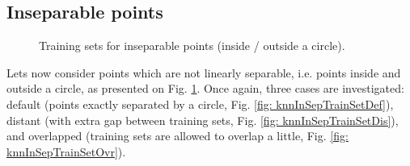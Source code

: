 \subsection{Inseparable points}
\label{sec: knnInSep}

\begin{figure}
\hfill
{}
\hfill
{}
\hfill
\centering{}
\hfill
\caption{Training sets for inseparable points (inside / outside a circle).}
\label{fig: knnInSepTrainSet}
\end{figure}

Lets now consider points which are not linearly separable, i.e. points inside and outside a circle, as presented on Fig. \ref{fig: knnInSepTrainSet}. Once again, three cases are investigated: default (points exactly separated by a circle, Fig. \ref{fig: knnInSepTrainSetDef}), distant (with extra gap between training sets, Fig. \ref{fig: knnInSepTrainSetDis}), and overlapped (training sets are allowed to overlap a little, Fig. \ref{fig: knnInSepTrainSetOvr}).

